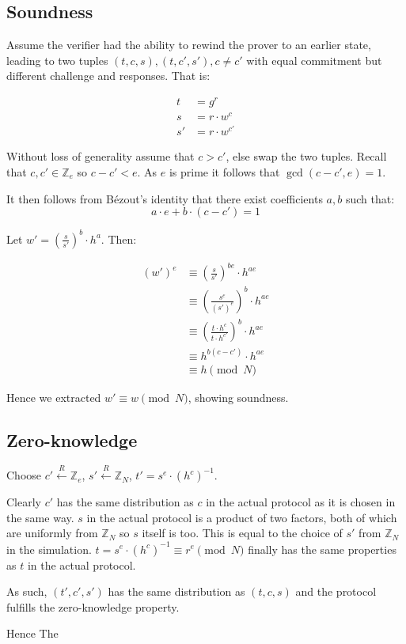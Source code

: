 \documentclass[a4paper]{scrreprt}
\begin{document}
\subsection{Soundness}

Assume the verifier had the ability to rewind the prover to an earlier state,
leading to two tuples $(t, c, s), (t, c', s'), c \neq c'$ with equal commitment
but different challenge and responses. That is:

\begin{align*}
		t & = g^r \\
		s & = r \cdot w^c \\
		s' & = r \cdot w^{c'}
\end{align*}

Without loss of generality assume that $c > c'$, else swap the two tuples.
Recall that $c, c' \in \mathbb{Z}_e$ so $c - c' < e$. As $e$ is prime it
follows that $\operatorname{gcd}(c - c', e) = 1$.

It then follows from Bézout's identity that there exist coefficients $a, b$
such that:
\[
		a \cdot e + b \cdot (c - c') = 1
\]

Let $w' = \left(\frac{s}{s'}\right)^b \cdot h^a$. Then:

\begin{align*}
		(w')^e & \equiv \left(\frac{s}{s'}\right)^{be} \cdot h^{ae} \\
			   & \equiv \left(\frac{s^e}{(s')^e}\right)^{b} \cdot h^{ae} \\
			   & \equiv \left(\frac{t \cdot h^c}{t \cdot h^{c'}}\right)^{b} \cdot h^{ae} \\
			   & \equiv h^{b (c - c')} \cdot h^{ae} \\
			   & \equiv h \pmod{N}
\end{align*}

Hence we extracted $w' \equiv w \pmod{N}$, showing soundness.

\subsection{Zero-knowledge}

Choose $c' \xleftarrow{R} \mathbb{Z}_e$, $s' \xleftarrow{R} \mathbb{Z}_N$, $t' =
s^e \cdot (h^c)^{-1}$.

Clearly $c'$ has the same distribution as $c$ in the actual protocol as it is
chosen in the same way. $s$ in the actual protocol is a product of two factors,
both of which are uniformly from $\mathbb{Z}_N$ so $s$ itself is too. This is
equal to the choice of $s'$ from $\mathbb{Z}_N$ in the simulation. $t = s^e
\cdot (h^c)^{-1} \equiv r^e \pmod{N}$ finally has the same properties as $t$ in
the actual protocol.

As such, $(t', c', s')$ has the same distribution as $(t, c, s)$ and the
protocol fulfills the zero-knowledge property.

Hence The
\end{document}
